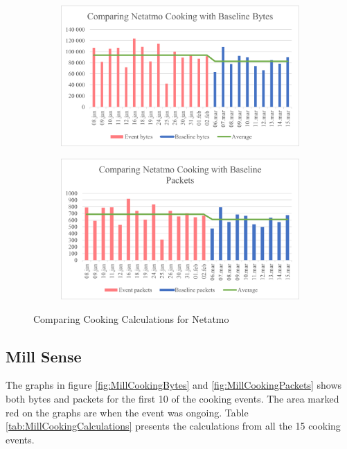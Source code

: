\begin{figure}[H]
    \centering
    \begin{subfigure}{0.49\textwidth}
        \centering
        \includegraphics[width=1\hsize]{figures/Netatmo_Comparing_Cooking_Calculations_Bytes.png} 
    \end{subfigure}
    \begin{subfigure}{0.49\textwidth}
        \centering
        \includegraphics[width=1\hsize]{figures/Netatmo_Comparing_Cooking_Calculations_Packets.png} 
    \end{subfigure}
    \caption{Comparing Cooking Calculations for Netatmo}
    \label{fig:NetatmoComparingCookingCalculations}
\end{figure}

\subsection{Mill Sense}
The graphs in figure \ref{fig:MillCookingBytes} and \ref{fig:MillCookingPackets} shows both bytes and packets for the first 10 of the cooking events. The area marked red on the graphs are when the event was ongoing. Table \ref{tab:MillCookingCalculations} presents the calculations from all the 15 cooking events. 

